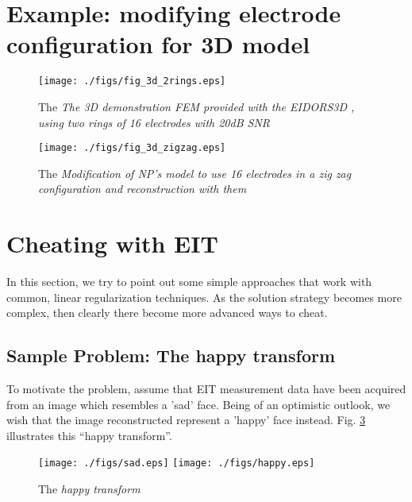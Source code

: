 \documentclass[12pt]{iopart}
\begin{document}
\section{
 Example: modifying electrode configuration for 3D model
}

%
%
\begin{figure}[th]
\begin{flushright}
\texttt{[image: ./figs/fig\_3d\_2rings.eps]}
\caption{\small The 
{\em The 3D demonstration FEM provided with the EIDORS3D
\cite{Polydorides_and_Lionheart_2002},
using two rings of 16 electrodes with 20dB SNR
}
 \label{fig:fig_3d_2rings}
}
\end{flushright}
\end{figure}

%
%
\begin{figure}[th]
\begin{flushright}
\texttt{[image: ./figs/fig\_3d\_zigzag.eps]}
\caption{\small The 
{\em Modification of NP's model to use 16 electrodes in a
zig zag configuration and reconstruction with them}
 \label{fig:fig_3d_zigzag}
}
\end{flushright}
\end{figure}

\section{
 Cheating with EIT
}

In this section, we try to point out some
simple approaches that work with common, linear
regularization techniques. As the solution
strategy becomes more complex, then clearly there
become more advanced ways to cheat.

\subsection{
Sample Problem: The happy transform
}
To motivate the problem, assume that EIT measurement
data have been acquired from an image which resembles
a 'sad' face. Being of an optimistic outlook, we wish
that the image reconstructed represent a 'happy' face
instead. Fig. \ref{fig:happytransform}
illustrates this ``happy transform''.

%
%
\begin{figure}[th]
\begin{flushright}
\texttt{[image: ./figs/sad.eps]}
\texttt{[image: ./figs/happy.eps]}
\caption{\small The 
{\em happy transform}
 }
 \label{fig:happytransform}
\end{flushright}
\end{figure}
\end{document}
